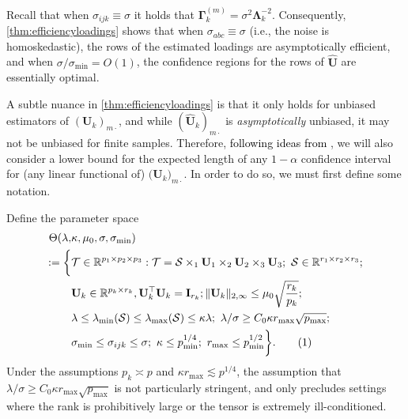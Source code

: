 \documentclass[10pt]{article}
\newcommand{\0}{{\mathbf{0}}}
\newcommand{\1}{{\mathbf{1}}}
\newcommand{\U}{{\mathbf{U}}}
\renewcommand{\citet}{\cite}
\renewcommand{\t}{^{\top}}
\newcommand{\uhat}{\mathbf{\hat{U}}}
\renewcommand{\hat}{\widehat}
\newcommand\numberthis{\addtocounter{equation}{1}\tag{\theequation}}
\renewcommand{\hat}{\widehat}
\begin{document}
 Recall that when $\sigma_{ijk} \equiv \sigma$ it holds that $\mathbf{\Gamma}^{(m)}_k = \sigma^2 \mathbf{\Lambda}_k^{-2}$.   Consequently, \cref{thm:efficiencyloadings} shows that when $\sigma_{abc} \equiv \sigma$ (i.e., the noise is homoskedastic), the rows of the estimated loadings are asymptotically efficient, and when $\sigma/\sigma_{\min} = O(1)$, the confidence regions for the rows of $\uhat$ are essentially optimal.  

A subtle nuance in \cref{thm:efficiencyloadings} is that it only holds for unbiased estimators of $(\mathbf{U}_k)_{m\cdot}$, and while $(\uhat_k)_{m\cdot}$ is \emph{asymptotically} unbiased, it may not be unbiased for finite samples. Therefore, \textcolor{black}{following ideas from \citet{cai_confidence_2017}}, we will also consider a lower bound for the expected length of any $1-\alpha$ confidence interval for (any linear functional of) $\big(\mathbf{U}_k\big)_{m\cdot}$.  In order to do so, we must first define some notation.

Define the parameter space
 \begin{align*}
     \Theta( \lambda,&\kappa,\mu_0,\sigma,\sigma_{\min}) \\
     := \bigg\{ &\mathcal{T} \in \mathbb{R}^{p_1 \times p_2 \times p_3}: \mathcal{T} = \mathcal{S} \times_1 \mathbf{U}_1 \times_2 \U_2 \times_3 \U_3;\  \mathcal{S} \in \mathbb{R}^{r_1 \times r_2 \times r_3}; \\
  &\mathbf{U}_k \in \mathbb{R}^{p_k \times r_k}, \U_k\t \U_k = \mathbf{I}_{r_k}; \| \U_k \|_{2,\infty} \leq \mu_0 \sqrt{\frac{r_k}{p_k}}; \\
  &\lambda \leq \lambda_{\min}(\mathcal{S}) \leq \lambda_{\max}(\mathcal{S}) \leq \kappa \lambda; \ \lambda/\sigma \geq C_0 \kappa r_{\max} \sqrt{p_{\max}}; \\
  &\sigma_{\min} \leq  \sigma_{ijk} \leq \sigma; \ \kappa \leq p_{\min}^{1/4}; \ r_{\max} \leq p_{\min}^{1/2} \bigg\}. \numberthis \label{parameterspace}
 \end{align*}
 Under the assumptions $p_k \asymp p$ and $\kappa r_{\max} \lesssim p^{1/4}$, the assumption that $\lambda/\sigma \geq C_0 \kappa r_{\max} \sqrt{p_{\max}}$ is not particularly stringent, and only precludes settings where the rank is prohibitively large or the tensor is extremely ill-conditioned.
\end{document}
